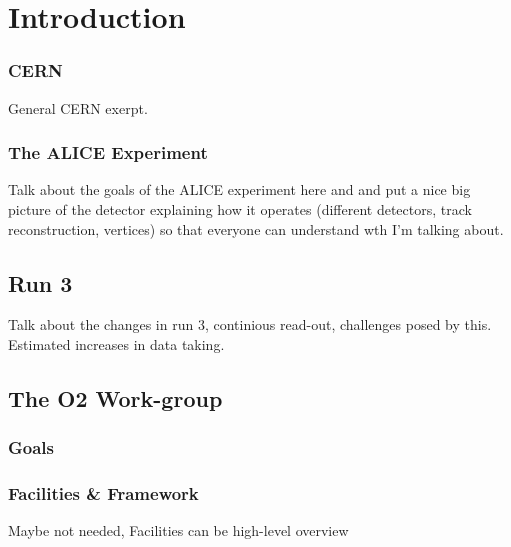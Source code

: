\documentclass{report}
\begin{document}
\chapter{Introduction}
\subsection{CERN}
General CERN exerpt.
\subsection{The ALICE Experiment}
Talk about the goals of the ALICE experiment here and and put a nice big picture of the detector explaining how it operates (different detectors, track reconstruction, vertices)
so that everyone can understand wth I'm talking about.

\section{Run 3}
Talk about the changes in run 3, continious read-out, challenges posed by this. Estimated increases in data taking.
\section{The O2 Work-group}
\subsection{Goals}
\subsection{Facilities \& Framework}
Maybe not needed, Facilities can be high-level overview
\newpage
\end{document}

